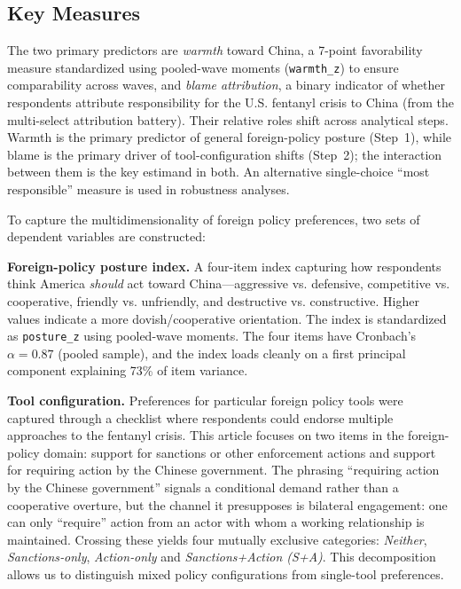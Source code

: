 \documentclass[12pt,letterpaper]{article}
\begin{document}


\subsection{Key Measures}

The two primary predictors are \emph{warmth} toward China, a 7-point favorability measure standardized using pooled-wave moments (\texttt{warmth\_z}) to ensure comparability across waves, and \emph{blame attribution}, a binary indicator of whether respondents attribute responsibility for the U.S. fentanyl crisis to China (from the multi-select attribution battery). Their relative roles shift across analytical steps. Warmth is the primary predictor of general foreign-policy posture (Step~1), while blame is the primary driver of tool-configuration shifts (Step~2); the interaction between them is the key estimand in both. An alternative single-choice ``most responsible'' measure is used in robustness analyses.

To capture the multidimensionality of foreign policy preferences, two sets of dependent variables are constructed:

\textbf{Foreign-policy posture index.} A four-item index capturing how respondents think America \emph{should} act toward China---aggressive vs. defensive, competitive vs. cooperative, friendly vs. unfriendly, and destructive vs. constructive. Higher values indicate a more dovish/cooperative orientation. The index is standardized as \texttt{posture\_z} using pooled-wave moments. The four items have Cronbach's $\alpha = 0.87$ (pooled sample), and the index loads cleanly on a first principal component explaining 73\% of item variance.

\textbf{Tool configuration.} Preferences for particular foreign policy tools were captured through a checklist where respondents could endorse multiple approaches to the fentanyl crisis. This article focuses on two items in the foreign-policy domain: support for sanctions or other enforcement actions and support for requiring action by the Chinese government. The phrasing ``requiring action by the Chinese government'' signals a conditional demand rather than a cooperative overture, but the channel it presupposes is bilateral engagement: one can only ``require'' action from an actor with whom a working relationship is maintained. Crossing these yields four mutually exclusive categories: \emph{Neither}, \emph{Sanctions‐only}, \emph{Action‐only} and \emph{Sanctions+Action (S+A)}. This decomposition allows us to distinguish mixed policy configurations from single-tool preferences.
\end{document}
